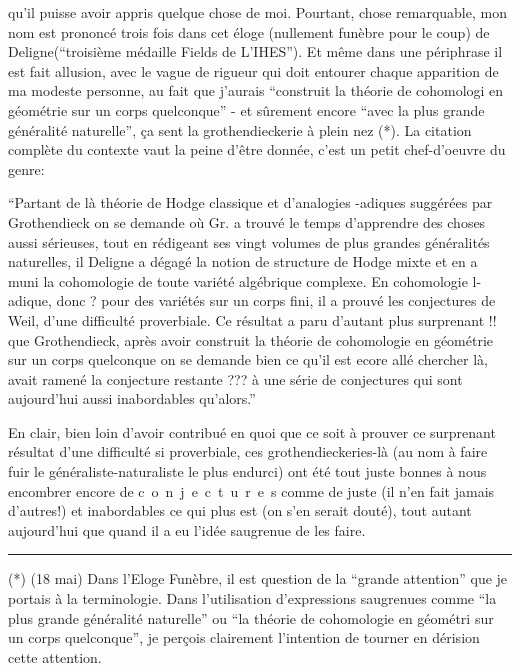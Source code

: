 

qu'il puisse avoir appris quelque chose de moi. Pourtant, chose remarquable, mon nom est prononcé trois fois dans cet éloge (nullement funèbre pour le coup) de Deligne(``troisième médaille Fields de L'IHES''). Et même dans une périphrase il est fait allusion, avec le vague de rigueur qui doit entourer chaque apparition de ma modeste personne, au fait que j'aurais ``construit la théorie de cohomologi en géométrie sur un corps quelconque'' - et sûrement encore ``avec la plus grande généralité naturelle'', ça sent la grothendieckerie à plein nez (*). La citation complète du contexte vaut la peine d'être donnée, c'est un petit chef-d'oeuvre du genre:

``Partant de là \handwritten{[}théorie de Hodge classique\handwritten{]} et d'analogies -adiques suggérées par Grothendieck \handwritten{[}on se demande où Gr. a trouvé le temps d'apprendre des choses aussi sérieuses, tout en rédigeant ses vingt volumes de plus grandes généralités naturelles\handwritten{]}, il \handwritten{[}Deligne\handwritten{]} a dégagé la notion de structure de Hodge mixte et en a muni la cohomologie de toute variété algébrique complexe. En cohomologie l-adique, donc \handwritten{[}?\handwritten{]} pour des variétés sur un corps fini, il a prouvé les conjectures de Weil, d'une difficulté proverbiale. Ce résultat a paru d'autant plus surprenant \handwritten{[}!!\handwritten{]} que Grothendieck, après avoir construit la théorie de cohomologie en géométrie sur un corps quelconque \handwritten{[}on se demande bien ce qu'il est ecore allé chercher là\handwritten{]}, avait ramené la conjecture restante \handwritten{[}???\handwritten{]} à une série de conjectures qui sont aujourd'hui aussi inabordables qu'alors.''

En clair, bien loin d'avoir contribué en quoi que ce soit à prouver ce surprenant résultat d'une difficulté si proverbiale, ces grothendieckeries-là (au nom à faire fuir le généraliste-naturaliste le plus endurci) ont été tout juste bonnes à nous encombrer encore de \mbox{c o n j e c t u r e s} comme de juste (il n'en fait jamais d'autres!) et inabordables ce qui plus est (on s'en serait douté), tout autant aujourd'hui que quand il a eu l'idée saugrenue de les faire.

\noindent\rule{.22\linewidth}{.4pt}

(*) (18 mai) Dans l'Eloge Funèbre, il est question de la ``grande attention'' que je portais à la terminologie. Dans l'utilisation d'expressions saugrenues comme ``la plus grande généralité naturelle'' ou ``la théorie de cohomologie en géométri sur un corps quelconque'', je perçois clairement l'intention de tourner en dérision cette attention.

